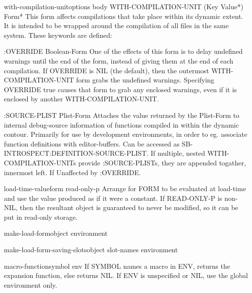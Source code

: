 \documentclass[10pt,english]{book}
\begin{document}
\begin{macro}{with-compilation-unit}{options \body body}
  WITH-COMPILATION-UNIT ({Key Value}*) Form*
  This form affects compilations that take place within its dynamic extent. It
  is intended to be wrapped around the compilation of all files in the same
  system. These keywords are defined:

    :OVERRIDE Boolean-Form
        One of the effects of this form is to delay undefined warnings
        until the end of the form, instead of giving them at the end of each
        compilation. If OVERRIDE is NIL (the default), then the outermost
        WITH-COMPILATION-UNIT form grabs the undefined warnings. Specifying
        OVERRIDE true causes that form to grab any enclosed warnings, even if
        it is enclosed by another WITH-COMPILATION-UNIT.

    :SOURCE-PLIST Plist-Form
        Attaches the value returned by the Plist-Form to internal debug-source
        information of functions compiled in within the dynamic contour.
        Primarily for use by development environments, in order to eg. associate
        function definitions with editor-buffers. Can be accessed as
        SB-INTROSPECT:DEFINITION-SOURCE-PLIST. If multiple, nested
        WITH-COMPILATION-UNITs provide :SOURCE-PLISTs, they are appended
        togather, innermost left. If  Unaffected by :OVERRIDE.
\end{macro}

\begin{specialop}{load-time-value}{form \op read-only-p}
  Arrange for FORM to be evaluated at load-time and use the value produced
   as if it were a constant. If READ-ONLY-P is non-NIL, then the resultant
   object is guaranteed to never be modified, so it can be put in read-only
   storage.
\end{specialop}

\begin{generic}{make-load-form}{object \op environment}
  
\end{generic}

\begin{function}{make-load-form-saving-slots}{object \key slot-names environment}
  
\end{function}

\begin{accessor}{macro-function}{symbol \op env}
  If SYMBOL names a macro in ENV, returns the expansion function,
else returns NIL. If ENV is unspecified or NIL, use the global environment
only.
\end{accessor}
\end{document}
